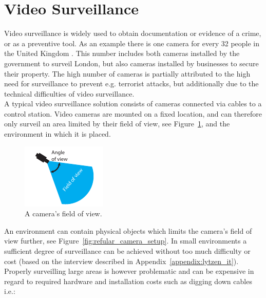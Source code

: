 \section{Video Surveillance}\label{sec:video_surveillance}
Video surveillance is widely used to obtain documentation or evidence of a crime, or as a preventive tool.
As an example there is one camera for every 32 people in the United Kingdom \citep{london_camera_surveillance}.
This number includes both cameras installed by the government to surveil London, but also cameras installed by businesses to secure their property.
The high number of cameras is partially attributed to the high need for surveillance to prevent e.g. terrorist attacks, but additionally due to the technical difficulties of video surveillance. \\

A typical video surveillance solution consists of cameras connected via cables to a control station.
Video cameras are mounted on a fixed location, and can therefore only surveil an area limited by their field of view, see Figure~\ref{fig:camera_properties}, and the environment in which it is placed.\\

\begin{figure}[htb]
    \centering
    \includegraphics[scale=1.8]{gfx/camera_properties.pdf}
    \caption{A camera's field of view.}
    \label{fig:camera_properties}
\end{figure}


An environment can contain physical objects which limits the camera's field of view further, see Figure~\ref{fig:refular_camera_setup}.
In small environments a sufficient degree of surveillance can be achieved without too much difficulty or cost (based on the interview described in Appendix~\ref{appendix:lytzen_it}).
Properly surveilling large areas is however problematic and can be expensive in regard to required hardware and installation costs such as digging down cables i.e.:



